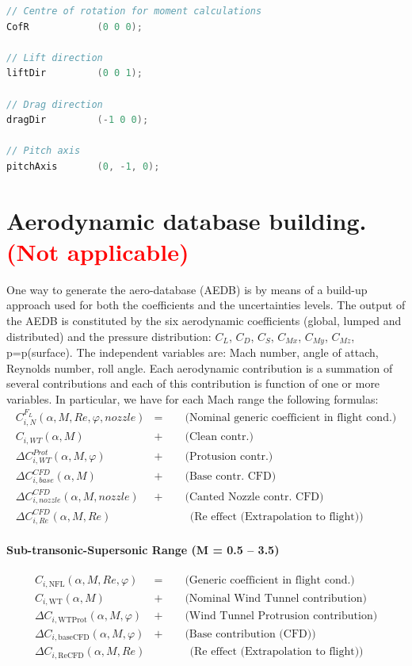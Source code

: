 \documentclass[12pt]{article}
\begin{document}
%
\begin{lstlisting}[caption=Definition of the aerodynamic directions in the file system/FOs/FOforceCoeffs., label=lst:dirs, language=C++]
// Centre of rotation for moment calculations
CofR            (0 0 0);

// Lift direction
liftDir         (0 0 1);

// Drag direction
dragDir         (-1 0 0);

// Pitch axis
pitchAxis       (0, -1, 0);
\end{lstlisting}

\section{Aerodynamic database building. \textcolor{red}{\textbf{(Not applicable)}}}
One way to generate the aero-database (AEDB) is by means of a build-up approach used for both the coefficients and the uncertainties levels. The output of the AEDB is constituted by the six aerodynamic coefficients (global, lumped and distributed) and the pressure distribution: $C_L$, $C_D$, $C_S$, $C_{Mx}$, $C_{My}$, $C_{Mz}$, p=p(surface). The independent variables are: Mach number, angle of attach, Reynolds number, roll angle. Each aerodynamic contribution is a summation of several contributions and each of this contribution is function of one or more variables. In particular, we have for each Mach range the following formulas:
%
\begin{align}
C_{i,N}^{F_L}(\alpha, M, Re, \varphi, nozzle) &= \qquad \text{(Nominal generic coefficient in flight cond.)} \\
C_{i,WT}(\alpha, M) &+ \qquad \text{(Clean contr.)} \\
\Delta C_{i,WT}^{Prot}(\alpha, M, \varphi) &+ \qquad \text{(Protusion contr.)} \\
\Delta C_{i,base}^{CFD}(\alpha, M) &+ \qquad \text{(Base contr. CFD)} \\
\Delta C_{i,nozzle}^{CFD}(\alpha, M, nozzle) &+ \qquad \text{(Canted Nozzle contr. CFD)} \\
\Delta C_{i,Re}^{CFD}(\alpha, M, Re) & \quad \ \qquad \text{(Re effect (Extrapolation to flight))}
\end{align}
%
\paragraph{\textbf{Sub-transonic-Supersonic Range (M = 0.5 – 3.5)}}
\begin{align}
C_{i,\text{NFL}}(\alpha, M, Re, \varphi) &= \qquad \text{(Generic coefficient in flight cond.)} \\
C_{i,\text{WT}}(\alpha, M) &+ \qquad \text{(Nominal Wind Tunnel contribution)} \\
\Delta C_{i,\text{WTProt}}(\alpha, M, \varphi) &+ \qquad \text{(Wind Tunnel Protrusion contribution)} \\
\Delta C_{i,\text{baseCFD}}(\alpha, M, \varphi) &+ \qquad \text{(Base contribution (CFD))} \\
\Delta C_{i,\text{ReCFD}}(\alpha, M, Re) & \quad \ \qquad \text{(Re effect (Extrapolation to flight))}
\end{align}
%
\end{document}
